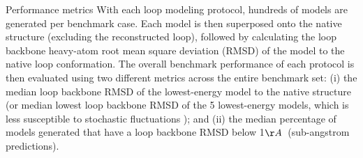 Performance metrics
With each loop modeling protocol, hundreds of models are generated per benchmark case. Each model is then superposed onto the native structure (excluding the reconstructed loop), followed by calculating the loop backbone heavy-atom root mean square deviation (RMSD) of the model to the native loop conformation. The overall benchmark performance of each protocol is then evaluated using two different metrics across the entire benchmark set: (i) the median loop backbone RMSD of the lowest-energy model to the native structure (or median lowest loop backbone RMSD of the 5 lowest-energy models, which is less susceptible to stochastic fluctuations \cite{leaver-fay_chapter_2013}); and (ii) the median percentage of models generated that have a loop backbone RMSD below 1$\AA$\ (sub-angstrom predictions).

